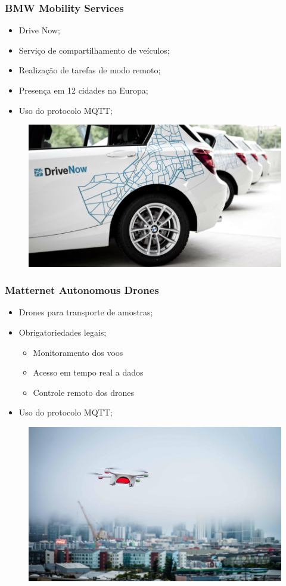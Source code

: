 \documentclass[12pt]{beamer}
\begin{document}
\begin{frame}
    \frametitle{BMW Mobility Services}
    \begin{itemize}
        \item Drive Now;
        \item Serviço de compartilhamento de veículos;
        \item Realização de tarefas de modo remoto;
        \item Presença em 12 cidades na Europa;
        \item Uso do protocolo MQTT;
    \end{itemize}
     \begin{figure}[!htb]
         \centering
        \includegraphics[width=.6\textwidth]{drive_now}
    \end{figure}
\end{frame}

\begin{frame}
    \frametitle{Matternet Autonomous Drones}
    \begin{itemize}
        \item Drones para transporte de amostras;
        \item Obrigatoriedades legais;
                \begin{itemize}
                    \item Monitoramento dos voos
                    \item Acesso em tempo real a dados
                    \item Controle remoto dos drones
                \end{itemize}
        \item Uso do protocolo MQTT;
    \end{itemize}
    \begin{figure}[!htb]
        \includegraphics[width=.6\textwidth]{matternet_drone}
    \end{figure}
\end{frame}
\end{document}
